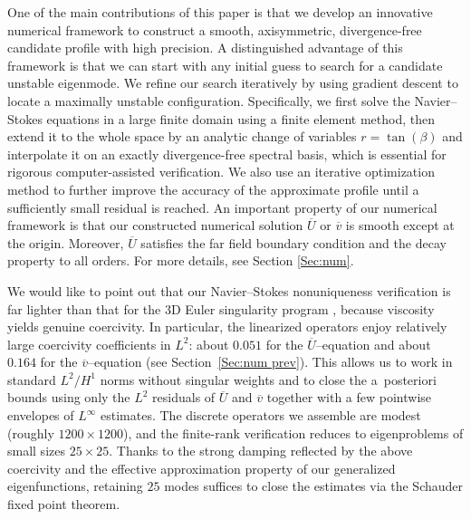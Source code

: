 \documentclass[11pt,a4paper]{article}
\numberwithin{equation}{section}
\begin{document}
 One of the main contributions of this paper is that we
develop an innovative numerical framework to construct a smooth, axisymmetric, divergence-free candidate profile with high precision. A distinguished advantage of this framework is that we can start with any initial guess to search for a candidate unstable eigenmode. We refine our search iteratively by using gradient descent to locate a maximally unstable configuration. Specifically, we first solve the Navier--Stokes equations in a large finite domain using a finite element method, then extend it to the whole space by an analytic change of variables $r =\tan(\beta)$ and interpolate it on an exactly divergence-free spectral basis, which is essential for rigorous computer-assisted verification. We also use an iterative optimization method to further improve the accuracy of the approximate profile  until a sufficiently small residual is reached. An important property of our numerical framework is that our constructed numerical solution $\overline{U}$ or $\overline{v}$ is smooth except at the origin. Moreover, $\overline{U}$ satisfies the far field boundary condition and the decay property to all orders.
For more details,
see Section \ref{Sec:num}.


We would like to point out that our
Navier--Stokes nonuniqueness verification is far lighter than that for the 3D Euler singularity program  \cite{chen2022stable,ChenHou2023b,ChenHou2025}, because viscosity yields genuine coercivity.
In particular, the linearized operators enjoy relatively large coercivity coefficients in $L^2$:
about $0.051$ for the $\overline U$--equation and about $0.164$ for the $\overline v$--equation
(see Section~\ref{Sec:num prev}). This allows us to work in standard $L^2/H^1$ norms without
singular weights and to close the a~posteriori bounds using only the $L^2$ residuals of
$\overline U$ and $\overline v$ together with a few pointwise envelopes of $L^\infty$ estimates. The discrete operators we
assemble are modest (roughly $1200\times1200$), and the finite-rank verification reduces to eigenproblems of small sizes $25\times25$.  Thanks to the strong damping reflected by the
above coercivity and the effective approximation property of our generalized eigenfunctions, retaining $25$ modes suffices to close the estimates via the Schauder fixed point
theorem. 
\end{document}
